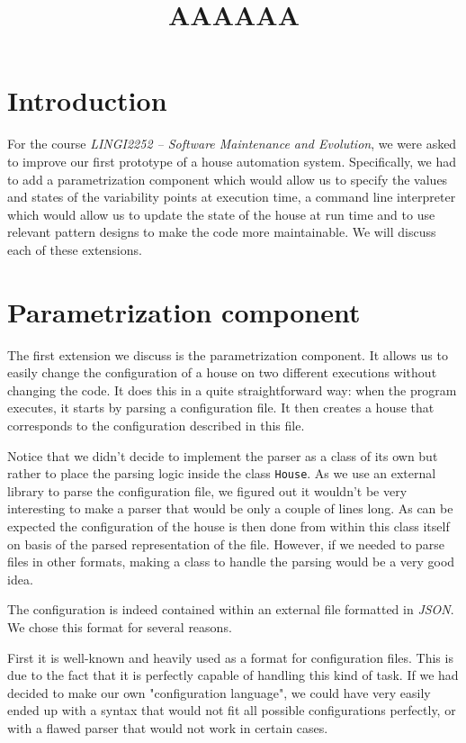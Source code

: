     \title{AAAAAA}
    \newpage

	\section{Introduction}
		For the course \textit{LINGI2252 -- Software Maintenance and Evolution}, we were asked to improve our first prototype of a house automation system. Specifically, we had to add a parametrization component which would allow us to specify the values and states of the variability points at execution time, a command line interpreter which would allow us to update the state of the house at run time and to use relevant pattern designs to make the code more maintainable. We will discuss each of these extensions.

	\section{Parametrization component}
		The first extension we discuss is the parametrization component.
		It allows us to easily change the configuration of a house on two different executions without changing the code.
		It does this in a quite straightforward way: when the program executes, it starts by parsing a configuration file. It then creates a house that corresponds to the configuration described in this file.

		Notice that we didn't decide to implement the parser as a class of its own but rather to place the parsing logic inside the class \texttt{House}. As we use an external library to parse the configuration file, we figured out it wouldn't be very interesting to make a parser that would be only a couple of lines long. As can be expected the configuration of the house is then done from within this class itself on basis of the parsed representation of the file. However, if we needed to parse files in other formats, making a class to handle the parsing would be a very good idea.

		The configuration is indeed contained within an external file formatted in \textit{JSON}.
		We chose this format for several reasons.

		First it is well-known and heavily used as a format for configuration files. This is due to the fact that it is perfectly capable of handling this kind of task. If we had decided to make our own "configuration language", we could have very easily ended up with a syntax that would not fit all possible configurations perfectly, or with a flawed parser that would not work in certain cases.

